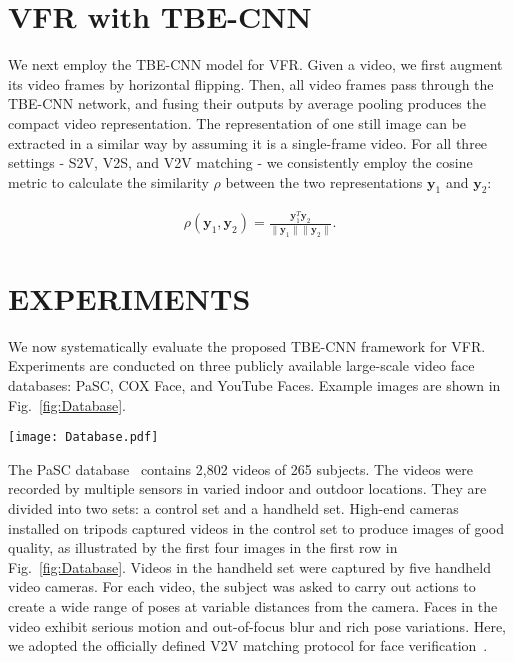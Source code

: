 \documentclass[10pt,journal,cspaper,compsoc]{IEEEtran}
\begin{document}
\section{VFR with TBE-CNN}
\label{Sec:VFR}
We next employ the TBE-CNN model for VFR.
Given a video, we first augment its video frames by horizontal flipping.
Then, all video frames pass through the TBE-CNN network, and fusing their outputs by average pooling produces the compact video representation.
The representation of one still image can be extracted in a similar way by assuming it is a single-frame video.
For all three settings - S2V, V2S, and V2V matching - we consistently employ the cosine metric to calculate the similarity $\rho$ between the two representations $\mathbf{y}_{1}$ and $\mathbf{y}_{2}$:

\begin{align}
\rho\left(\mathbf{y}_{1}, \mathbf{y}_{2}\right) = \frac{\mathbf{y}_{1}^{T}\mathbf{y}_{2}}{\|\mathbf{y}_{1}\|\|\mathbf{y}_{2}\|}.
\end{align}



\section{EXPERIMENTS}
\label{Sec:EXPERIMENTS}
We now systematically evaluate the proposed TBE-CNN framework for VFR.
Experiments are conducted on three publicly available large-scale video face databases: PaSC, COX Face, and YouTube Faces.
Example images are shown in Fig.~\ref{fig:Database}.

\begin{figure*}
\centering
\texttt{[image: Database.pdf]}
\caption{Sample video frames after normalization: PaSC (first row), COX Face (second row), and YouTube Faces (third row).
For each database, the four frames on the left are sampled from a video recorded under relatively good conditions,
and the four frames on the right are selected from low-quality video.
}
\label{fig:Database}
\end{figure*}

The PaSC database~\cite{beveridge2013challenge} contains 2,802 videos of 265 subjects.
The videos were recorded by multiple sensors in varied indoor and outdoor locations.
They are divided into two sets: a control set and a handheld set.
High-end cameras installed on tripods captured videos in the control set to produce images of good quality,
as illustrated by the first four images in the first row in Fig.~\ref{fig:Database}.
Videos in the handheld set were captured by five handheld video cameras.
For each video, the subject was asked to carry out actions to create a wide range of poses at variable distances from the camera.
Faces in the video exhibit serious motion and out-of-focus blur and rich pose variations.
Here, we adopted the officially defined V2V matching protocol for face verification~\cite{beveridge2013challenge}.
\end{document}
